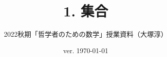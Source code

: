 \documentclass[11pt,a4paper]{jsarticle}
\begin{document}
\title{1. 集合}
\author{2022秋期「哲学者のための数学」授業資料（大塚淳）}
\date{ver. \today}
\maketitle





%
\end{document}
